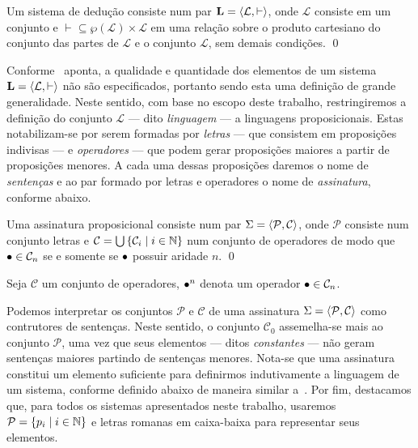\begin{definition}[Sistema]
    Um sistema de dedução consiste num par $\mathbf{L} = \langle\mathcal{L}, \vdash\rangle$, onde $\mathcal{L}$ consiste em um conjunto e ${\vdash}\subseteq\wp(\mathcal{L})\times\mathcal{L}$ em uma relação sobre o produto cartesiano do conjunto das partes de $\mathcal{L}$ e o conjunto $\mathcal{L}$, sem demais condições.
    \qed{}
\end{definition}

Conforme~\cite{Beziau} aponta, a qualidade e quantidade dos elementos de um sistema $\mathbf{L}=\langle\mathcal{L}, \vdash\rangle$ não são especificados, portanto sendo esta uma definição de grande generalidade. Neste sentido, com base no escopo deste trabalho, restringiremos a definição do conjunto $\mathcal{L}$ --- dito \emph{linguagem} --- a linguagens proposicionais. Estas notabilizam-se por serem formadas por \emph{letras} --- que consistem em proposições indivisas --- e \emph{operadores} --- que podem gerar proposições maiores a partir de proposições menores. A cada uma dessas proposições daremos o nome de \emph{sentenças} e ao par formado por letras e operadores o nome de \emph{assinatura}, conforme abaixo.

\begin{definition}[Assinatura]
    Uma assinatura proposicional consiste num par $\Sigma=\langle\mathcal{P},\mathcal{C}\rangle$, onde $\mathcal{P}$ consiste num conjunto letras e $\mathcal{C}=\bigcup\left\{\mathcal{C}_i\mid i\in\mathbb{N}\right\}$ num conjunto de operadores de modo que $\mathalpha{\bullet}\in\mathcal{C}_n$ se e somente se $\mathalpha{\bullet}$ possuir aridade $n$.
    \qed{}
\end{definition}

\begin{notation}
    Seja $\mathcal{C}$ um conjunto de operadores, $\mathalpha{\bullet}^n$ denota um operador $\mathalpha{\bullet}\in\mathcal{C}_n$.
\end{notation}

Podemos interpretar os conjuntos $\mathcal{P}$ e $\mathcal{C}$ de uma assinatura $\Sigma=\langle\mathcal{P},\mathcal{C}\rangle$ como contrutores de sentenças.
Neste sentido, o conjunto $\mathcal{C}_0$ assemelha-se mais ao conjunto $\mathcal{P}$, uma vez que seus elementos --- ditos \emph{constantes} --- não geram sentenças maiores partindo de sentenças menores.
Nota-se que uma assinatura constitui um elemento suficiente para definirmos indutivamente a linguagem de um sistema, conforme definido abaixo de maneira similar a~\cite{Franks}.
Por fim, destacamos que, para todos os sistemas apresentados neste trabalho, usaremos $\mathcal{P}=\left\{p_i\mid i\in\mathbb{N}\right\}$ e letras romanas em caixa-baixa para representar seus elementos.

